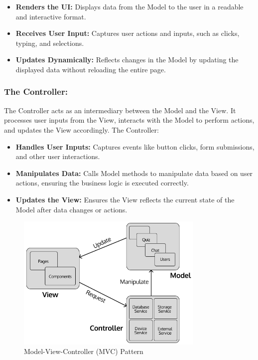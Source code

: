 \begin{itemize}

    \item \textbf{Renders the UI:} Displays data from the Model to the user in a readable and interactive format.
    \item \textbf{Receives User Input:} Captures user actions and inputs, such as clicks, typing, and selections.
    \item \textbf{Updates Dynamically:} Reflects changes in the Model by updating the displayed data without reloading the entire page.

\end{itemize}

\subsubsection{The Controller:}

The Controller acts as an intermediary between the Model and the View. It processes user inputs from the View, interacts with the Model to perform actions, and updates the View accordingly. The Controller:

\begin{itemize}

    \item \textbf{Handles User Inputs:} Captures events like button clicks, form submissions, and other user interactions.
    \item \textbf{Manipulates Data:} Calls Model methods to manipulate data based on user actions, ensuring the business logic is executed correctly.
    \item \textbf{Updates the View:} Ensures the View reflects the current state of the Model after data changes or actions.

\end{itemize}

\begin{figure}[H]
\centering
\includegraphics[width=0.8\textwidth]{Images/MVC Pattern.png}
\caption{Model-View-Controller (MVC) Pattern}
\end{figure}

